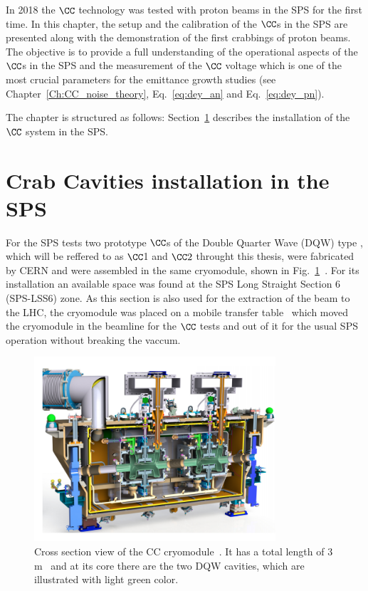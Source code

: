 \vspace*{-1mm}

In 2018 the $\CC$ technology was tested with proton beams in the SPS for the first time. In this chapter, the setup and the calibration of the $\CC$s in the SPS are presented along with the demonstration of the first crabbings of proton beams. The objective is to provide a full understanding of the operational aspects of the $\CC$s in the SPS and the measurement of the $\CC$ voltage which is one of the most crucial parameters for the emittance growth studies (see Chapter~\ref{Ch:CC_noise_theory}, Eq.~\eqref{eq:dey_an} and Eq.~\eqref{eq:dey_pn}). 

The chapter is structured as follows: Section~\ref{sec:cc_sps_installation} describes the installation of the $\CC$ system in the SPS.

\section{Crab Cavities installation in the SPS}\label{sec:cc_sps_installation}
For the SPS tests two prototype $\CC$s of the Double Quarter Wave (DQW) type
, which will be reffered to as $\CC$1 and $\CC2$ throught this thesis, were fabricated by CERN and were assembled in the same cryomodule, shown in Fig.~\ref{fig:DQW_cryomodule}~\cite{Zanoni:2017}. For its installation an available space was found at the SPS Long Straight Section 6 (SPS-LSS6) zone. As this section is also used for the extraction of the beam to the LHC, the cryomodule was placed on a mobile transfer table~\cite{Calaga:2649807} which  moved the cryomodule in the beamline for the $\CC$ tests and out of it for the usual SPS operation without breaking the vaccum.

\begin{figure}[h]
   \centering         
   \includegraphics[width=0.8\textwidth]{images/Ch4/CC_cryomodule.png}
       \caption{Cross section view of the CC cryomodule~\cite{Zanoni:2017}. It has a total length of 3\,m~\cite{Baudrenghien:1520896} and at its core there are the two DQW cavities, which are illustrated with light green color.}
       \label{fig:DQW_cryomodule}
\end{figure}

